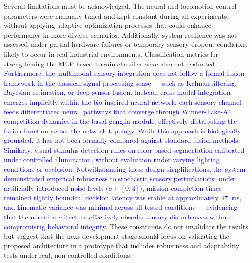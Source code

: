 \documentclass[preprint,12pt]{elsarticle}
\newcommand{\revblue}[1]{\textcolor{blue}{#1}}
\begin{document}
Several limitations must be acknowledged. The neural and locomotion-control parameters were manually tuned and kept constant during all experiments, without applying adaptive optimization processes that could enhance performance in more diverse scenarios. Additionally, system resilience was not assessed under partial hardware failures or temporary sensory dropout-conditions likely to occur in real industrial environments. Classification metrics for strengthening the MLP-based terrain classifier were also not evaluated. \revblue{Furthermore, the multimodal sensory integration does not follow a formal fusion framework in the classical signal-processing sense --- such as Kalman filtering, Bayesian estimation, or deep sensor fusion. Instead, cross-modal integration emerges implicitly within the bio-inspired neural network: each sensory channel feeds differentiated neural pathways that converge through Winner-Take-All competition dynamics in the basal ganglia module, effectively distributing the fusion function across the network topology. While this approach is biologically grounded, it has not been formally compared against standard fusion methods. Similarly, visual stimulus detection relies on color-based segmentation calibrated under controlled illumination, without evaluation under varying lighting conditions or occlusion. Notwithstanding these design simplifications, the system demonstrated empirical robustness to stochastic sensory perturbations: under artificially introduced noise levels ($\sigma \in [0, 4]$), mission completion times remained tightly bounded, decision latency was stable at approximately $47$~ms, and kinematic variance was minimal across all tested conditions --- evidencing that the neural architecture effectively absorbs sensory disturbances without compromising behavioral integrity.} These constraints do not invalidate the results but suggest that the next development stage should focus on validating the proposed architecture in a prototype that includes robustness and adaptability tests under real, non-controlled conditions.
\end{document}
